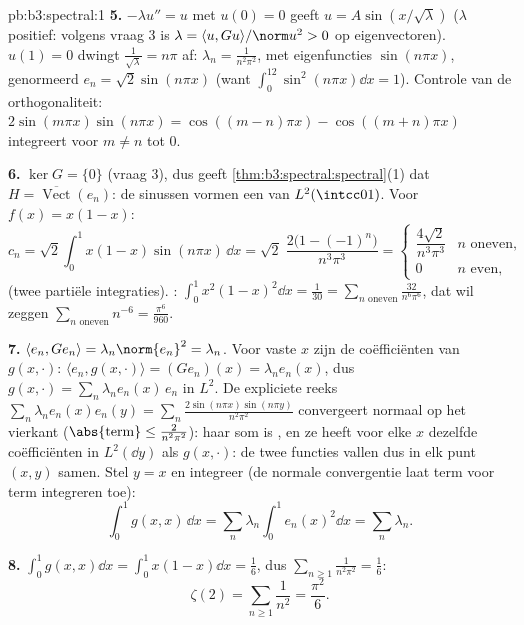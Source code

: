 \begin{solution}{pb:b3:spectral:1}
\textbf{5.} $-\lambda u'' = u$ met $u(0) = 0$ geeft $u =
A\sin(x/\sqrt \lambda)$ ($\lambda$ positief: volgens vraag 3 is
$\lambda = \langle u, Gu\rangle/\norm u^2 > 0$ op eigenvectoren).
$u(1) = 0$ dwingt $\frac1{\sqrt\lambda} = n\pi$ af: $\lambda_n =
\frac1{n^2\pi^2}$, met eigenfuncties $\sin(n\pi x)$, genormeerd
$e_n = \sqrt2\sin(n\pi x)$ (want $\int_0^12\sin^2(n\pi x)\dd x =
1$). Controle van de orthogonaliteit: $2\sin(m\pi x)\sin(n\pi x)
= \cos((m-n)\pi x) - \cos((m+n)\pi x)$ integreert voor $m \neq n$
tot $0$.

\textbf{6.} $\ker G = \{0\}$ (vraag 3), dus geeft
\cref{thm:b3:spectral:spectral}(1) dat $H =
\overline{\operatorname{Vect}}(e_n)$: de sinussen vormen een
 van $L^2(\intcc01)$. Voor $f(x) = x(1 - x)$:
\[
c_n = \sqrt2\int_0^1x(1-x)\sin(n\pi x)\,\dd x
= \sqrt2\;\frac{2\bigl(1 - (-1)^n\bigr)}{n^3\pi^3}
= \begin{cases}\dfrac{4\sqrt2}{n^3\pi^3} & n \text{ oneven},\\
0 & n \text{ even},\end{cases}
\]
(twee partiële integraties). : $\int_0^1x^2(1-x)^2\dd x =
\frac1{30} = \sum_{n \text{ oneven}}\frac{32}{n^6\pi^6}$, dat wil
zeggen $\sum_{n\text{ oneven}}n^{-6} = \frac{\pi^6}{960}$.

\textbf{7.} $\langle e_n, Ge_n\rangle = \lambda_n\norm{e_n}^2 =
\lambda_n$. Voor vaste $x$ zijn de coëfficiënten van $g(x,
\cdot)$: $\langle e_n, g(x,\cdot)\rangle = (Ge_n)(x) =
\lambda_ne_n(x)$, dus $g(x,\cdot) = \sum_n\lambda_ne_n(x)\,e_n$
in $L^2$. De expliciete reeks $\sum_n\lambda_ne_n(x)e_n(y) =
\sum_n\frac{2\sin(n\pi x)\sin(n\pi y)}{n^2\pi^2}$ convergeert
normaal op het vierkant ($\abs{\text{term}} \leq
\frac2{n^2\pi^2}$): haar som is , en ze heeft voor elke
$x$ dezelfde coëfficiënten in $L^2(\dd y)$ als $g(x, \cdot)$: de
twee  functies vallen dus in elk punt $(x, y)$ samen.
Stel $y = x$ en integreer (de normale convergentie laat term voor
term integreren toe):
\[
\int_0^1g(x,x)\,\dd x =
\sum_n\lambda_n\int_0^1e_n(x)^2\dd x = \sum_n\lambda_n .
\]

\textbf{8.} $\int_0^1g(x,x)\dd x = \int_0^1x(1 - x)\dd x =
\frac16$, dus $\sum_{n\geq1}\frac1{n^2\pi^2} = \frac16$:
\[
\zeta(2) = \sum_{n\geq1}\frac1{n^2} = \frac{\pi^2}6 .
\]


\end{solution}
